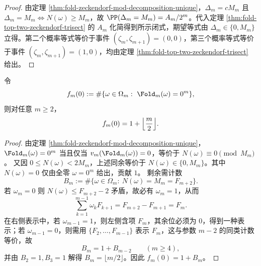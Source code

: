 \begin{proof}
由定理 \ref{thm:fold-zeckendorf-mod-decomposition-unique}，$\Delta_m=cM_m$ 且 $\Delta_m=M_m\iff N(\omega)\ge M_m$，故 $\PP(\Delta_m=M_m)=A_m/2^m$。代入定理 \ref{thm:fold-top-two-zeckendorf-trisect} 的 $A_m$ 化简得到所示闭式，期望等式由 $\Delta_m\in\{0,M_m\}$ 立得。第二个概率等式等价于事件 $(\zeta_m,\zeta_{m+1})=(0,0)$，第三个概率等式等价于事件 $(\zeta_m,\zeta_{m+1})=(1,0)$，均由定理 \ref{thm:fold-top-two-zeckendorf-trisect} 给出。
\end{proof}

\begin{proposition}[零剩余纤维的线性退化]\label{prop:fold-zero-fiber-linear}
令
\[
f_m(0):=\#\{\omega\in\Omega_m:\ \Fold_m(\omega)=0^m\},
\]
则对任意 $m\ge 2$，
\[
f_m(0)=1+\Bigl\lfloor\frac{m}{2}\Bigr\rfloor.
\]
\end{proposition}

\begin{proof}
由定理 \ref{thm:fold-zeckendorf-mod-decomposition-unique}，$\Fold_m(\omega)=0^m$ 当且仅当 $v_m(\Fold_m(\omega))=0$，等价于 $N(\omega)\equiv 0\pmod{M_m}$。
又因 $0\le N(\omega)<2M_m$，上述同余等价于 $N(\omega)\in\{0,M_m\}$。其中 $N(\omega)=0$ 仅由全零 $\omega=0^m$ 给出，贡献 $1$。
剩余需计数
\[
B_m:=\#\{\omega\in\Omega_m:\ N(\omega)=M_m=F_{m+2}\}.
\]
若 $\omega_m=0$ 则 $N(\omega)\le F_{m+2}-2$ 矛盾，故必有 $\omega_m=1$，从而
\[
\sum_{k=1}^{m-1}\omega_kF_{k+1}=F_{m+2}-F_{m+1}=F_m.
\]
在右侧表示中，若 $\omega_{m-1}=1$，则左侧含项 $F_m$，其余位必须为 $0$，得到一种表示；若 $\omega_{m-1}=0$，则需用 $\{F_2,\dots,F_{m-1}\}$ 表示 $F_m$，这与参数 $m-2$ 的同类计数等价，故
\[
B_m=1+B_{m-2}\qquad(m\ge 4),
\]
并由 $B_2=1,B_3=1$ 解得 $B_m=\lfloor m/2\rfloor$。因此 $f_m(0)=1+B_m$。
\end{proof}

